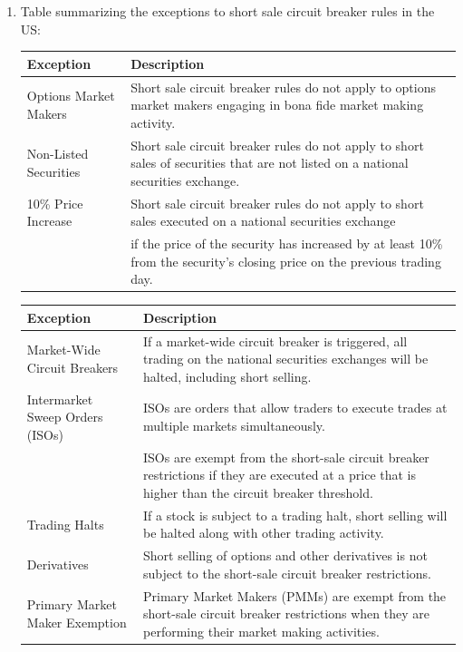 \documentclass[11pt]{article}
\begin{document}
\begin{enumerate}
\item Table summarizing the exceptions to short sale circuit breaker rules in the US:
\label{sec:org9b71fa3}

\begin{center}
\begin{tabular}{ll}
\hline
Exception & Description\\[0pt]
\hline
Options Market Makers & Short sale circuit breaker rules do not apply to options market makers engaging in bona fide market making activity.\\[0pt]
Non-Listed Securities & Short sale circuit breaker rules do not apply to short sales of securities that are not listed on a national securities exchange.\\[0pt]
10\% Price Increase & Short sale circuit breaker rules do not apply to short sales executed on a national securities exchange\\[0pt]
 & if the price of the security has increased by at least 10\% from the security's closing price on the previous trading day.\\[0pt]
\hline
\end{tabular}
\end{center}

\begin{center}
\begin{tabular}{ll}
\hline
Exception & Description\\[0pt]
\hline
Market-Wide Circuit Breakers & If a market-wide circuit breaker is triggered, all trading on the national securities exchanges will be halted, including short selling.\\[0pt]
Intermarket Sweep Orders (ISOs) & ISOs are orders that allow traders to execute trades at multiple markets simultaneously.\\[0pt]
 & ISOs are exempt from the short-sale circuit breaker restrictions if they are executed at a price that is higher than the circuit breaker threshold.\\[0pt]
Trading Halts & If a stock is subject to a trading halt, short selling will be halted along with other trading activity.\\[0pt]
Derivatives & Short selling of options and other derivatives is not subject to the short-sale circuit breaker restrictions.\\[0pt]
Primary Market Maker Exemption & Primary Market Makers (PMMs) are exempt from the short-sale circuit breaker restrictions when they are performing their market making activities.\\[0pt]
\hline
\end{tabular}
\end{center}


\end{enumerate}
\end{document}
